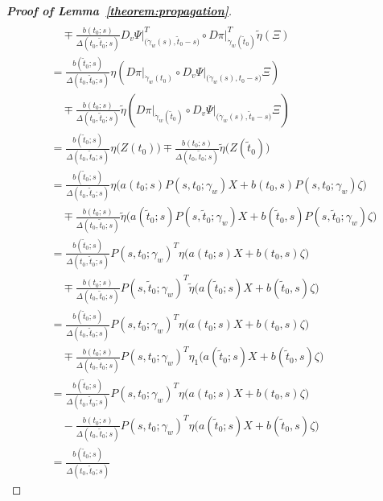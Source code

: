 \documentclass[a4paper,11pt,reqno]{amsart}
\numberwithin{equation}{section}
\theoremstyle{definition}
\theoremstyle{remark}
\begin{document}
\begin{proof}[{\bf Proof of Lemma~\ref{theorem:propagation}}]
\begin{align*}
\\
& \quad \mp
  \frac{b(t_0;s)}{\Delta(t_0,\tilde{t}_0;s)}
  D_v\Psi\vert^T_{\bigl(\dot{\gamma}_w(s),\tilde{t}_0-s\bigr)}
  \circ
  D\pi\vert^T_{\dot{\gamma}_w(\tilde{t}_0)}\tilde{\eta}(\Xi)
\\
& =
  \frac{b(\tilde{t}_0;s)}{\Delta(t_0,\tilde{t}_0;s)}
  \eta\left(
      D\pi\vert_{\dot{\gamma}_w(t_0)}
      \circ
      D_v\Psi\vert_{\bigl(\dot{\gamma}_w(s),t_0-s\bigr)}
      \Xi
      \right)
\\
& \quad \mp
  \frac{b(t_0;s)}{\Delta(t_0,\tilde{t}_0;s)}
  \tilde{\eta}\left(
              D\pi\vert_{\dot{\gamma}_w(\tilde{t}_0)}
              \circ
              D_v\Psi\vert_{\bigl(\dot{\gamma}_w(s),\tilde{t}_0-s\bigr)}
              \Xi
              \right)
\\
& =
  \frac{b(\tilde{t}_0;s)}{\Delta(t_0,\tilde{t}_0;s)}
  \eta\bigl(Z(t_0)\bigr)
  \mp
  \frac{b(t_0;s)}{\Delta(t_0,\tilde{t}_0;s)}
  \tilde{\eta}\bigl(Z(\tilde{t}_0)\bigr)
\\
& =
  \frac{b(\tilde{t}_0;s)}{\Delta(t_0,\tilde{t}_0;s)}
  \eta\bigl(a(t_0;s)P(s,t_0;\gamma_w)X
            +
            b(t_0,s)P(s,t_0;\gamma_w)\zeta
      \bigr)
\\
& \quad \mp
  \frac{b(t_0;s)}{\Delta(t_0,\tilde{t}_0;s)}
  \tilde{\eta}\bigl(
              a(\tilde{t}_0;s)P(s,\tilde{t}_0;\gamma_w)X
              +
              b(\tilde{t}_0,s)P(s,\tilde{t}_0;\gamma_w)\zeta
              \bigr)
\\
& =
  \frac{b(\tilde{t}_0;s)}{\Delta(t_0,\tilde{t}_0;s)}
  P(s,t_0;\gamma_w)^T\eta
  \bigl(a(t_0;s)X+b(t_0,s)\zeta\bigr)
\\
& \quad \mp
  \frac{b(t_0;s)}{\Delta(t_0,\tilde{t}_0;s)}
  P(s,\tilde{t}_0;\gamma_w)^T\tilde{\eta}
  \bigl(a(\tilde{t}_0;s)X+b(\tilde{t}_0,s)\zeta\bigr)
\\
& =
  \frac{b(\tilde{t}_0;s)}{\Delta(t_0,\tilde{t}_0;s)}
  P(s,t_0;\gamma_w)^T\eta
  \bigl(a(t_0;s)X+b(t_0,s)\zeta\bigr)
\\
& \quad \mp
  \frac{b(t_0;s)}{\Delta(t_0,\tilde{t}_0;s)}
  P(s,t_0;\gamma_w)^T\eta_1
  \bigl(a(\tilde{t}_0;s)X+b(\tilde{t}_0,s)\zeta\bigr)
\\
& =
  \frac{b(\tilde{t}_0;s)}{\Delta(t_0,\tilde{t}_0;s)}
  P(s,t_0;\gamma_w)^T\eta
  \bigl(a(t_0;s)X+b(t_0,s)\zeta\bigr)
\\
& \quad -
  \frac{b(t_0;s)}{\Delta(t_0,\tilde{t}_0;s)}
  P(s,t_0;\gamma_w)^T\eta
  \bigl(a(\tilde{t}_0;s)X+b(\tilde{t}_0,s)\zeta\bigr)
\\
& =
  \frac{b(\tilde{t}_0;s)}{\Delta(t_0,\tilde{t}_0;s)}

\end{align*}
\end{proof}
\end{document}

